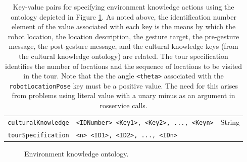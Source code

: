 \documentclass{CSSRforAfrica}
\begin{document}
\begin{table}[H]
\begin{center}
\begin{tabular}{|l l l|}
{\footnotesize \verb+culturalKnowledge+} 	                          & {\footnotesize \verb+<IDNumber> <Key1>, <Key2>, ..., <Keyn>+} \vspace{0mm} & {\footnotesize  String} \\
{\footnotesize \verb+tourSpecification+} 	                        & {\footnotesize \verb+<n> <ID1>, <ID2>, ..., <IDn>+  } \vspace{0mm} & {\footnotesize  } \\
\hline \hline
\end{tabular}
\end{center}
\caption{Key-value pairs for specifying environment knowledge actions using the ontology depicted in Figure \ref{fig:knowledge_ontology}. As noted above, the identification number element of the value  associated with each key is the means by which the robot location, the location description, the gesture target, the pre-gesture message, the post-gesture message, and the cultural knowledge keys (from the cultural knowledge ontology) are related.  The tour specification identifies the number of locations and the sequence of locations to be visited in the tour. Note that the the angle {\tt \small <theta>} associated with the {\tt \small robotLocationPose} key must be a positive value. The need for this arises from problems using  literal value with a unary minus as an argument in rosservice calls. }
\label{table:key-value_pairs}
\end{table}


\begin{figure}[H]
 
\caption{Environment knowledge ontology. }    
\label{fig:knowledge_ontology}
\end{figure}
 
\end{document}
